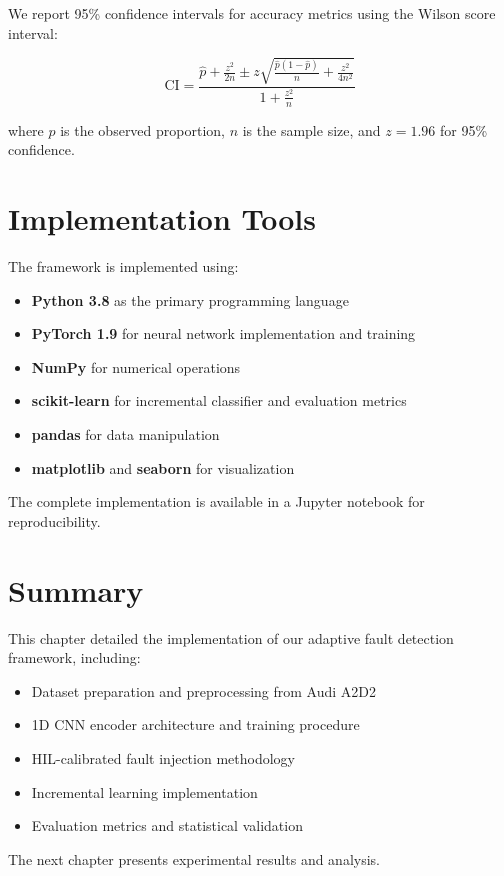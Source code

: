 We report 95\% confidence intervals for accuracy metrics using the Wilson score interval:

\begin{equation}
\text{CI} = \frac{\hat{p} + \frac{z^2}{2n} \pm z\sqrt{\frac{\hat{p}(1-\hat{p})}{n} + \frac{z^2}{4n^2}}}{1 + \frac{z^2}{n}}
\end{equation}

where $\hat{p}$ is the observed proportion, $n$ is the sample size, and $z = 1.96$ for 95\% confidence.

\section{Implementation Tools}

The framework is implemented using:
\begin{itemize}
    \item \textbf{Python 3.8} as the primary programming language
    \item \textbf{PyTorch 1.9} for neural network implementation and training
    \item \textbf{NumPy} for numerical operations
    \item \textbf{scikit-learn} for incremental classifier and evaluation metrics
    \item \textbf{pandas} for data manipulation
    \item \textbf{matplotlib} and \textbf{seaborn} for visualization
\end{itemize}

The complete implementation is available in a Jupyter notebook for reproducibility.

\section{Summary}

This chapter detailed the implementation of our adaptive fault detection framework, including:
\begin{itemize}
    \item Dataset preparation and preprocessing from Audi A2D2
    \item 1D CNN encoder architecture and training procedure
    \item HIL-calibrated fault injection methodology
    \item Incremental learning implementation
    \item Evaluation metrics and statistical validation
\end{itemize}

The next chapter presents experimental results and analysis.
